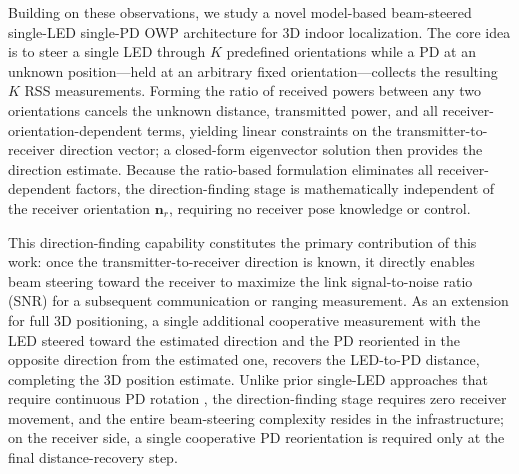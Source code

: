 \documentclass[journal]{IEEEtran}
\begin{document}
Building on these observations, we study a novel model-based beam-steered single-LED single-PD OWP architecture for 3D indoor localization. The core idea is to steer a single LED through $K$ predefined orientations while a PD at an unknown position---held at an arbitrary fixed orientation---collects the resulting $K$ RSS measurements. Forming the ratio of received powers between any two orientations cancels the unknown distance, transmitted power, and all receiver-orientation-dependent terms, yielding linear constraints on the transmitter-to-receiver direction vector; a closed-form eigenvector solution then provides the direction estimate. Because the ratio-based formulation eliminates all receiver-dependent factors, the direction-finding stage is mathematically independent of the receiver orientation $\mathbf{n}_r$, requiring no receiver pose knowledge or control.

This direction-finding capability constitutes the primary contribution of this work: once the transmitter-to-receiver direction is known, it directly enables beam steering toward the receiver to maximize the link signal-to-noise ratio (SNR) for a subsequent communication or ranging measurement. As an extension for full 3D positioning, a single additional cooperative measurement with the LED steered toward the estimated direction and the PD reoriented in the opposite direction from the estimated one, recovers the LED-to-PD distance, completing the 3D position estimate. Unlike prior single-LED approaches that require continuous PD rotation \cite{Liu2022, Wang2024, Shi2025}, the direction-finding stage requires zero receiver movement, and the entire beam-steering complexity resides in the infrastructure; on the receiver side, a single cooperative PD reorientation is required only at the final distance-recovery step.
\end{document}
